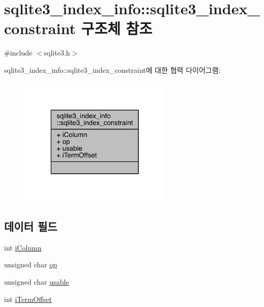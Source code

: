 \hypertarget{structsqlite3__index__info_1_1sqlite3__index__constraint}{}\section{sqlite3\+\_\+index\+\_\+info\+:\+:sqlite3\+\_\+index\+\_\+constraint 구조체 참조}
\label{structsqlite3__index__info_1_1sqlite3__index__constraint}


{\ttfamily \#include $<$sqlite3.\+h$>$}



sqlite3\+\_\+index\+\_\+info\+:\+:sqlite3\+\_\+index\+\_\+constraint에 대한 협력 다이어그램\+:
\nopagebreak
\begin{figure}[H]
\begin{center}
\leavevmode
\includegraphics[width=208pt]{dc/d83/structsqlite3__index__info_1_1sqlite3__index__constraint__coll__graph}
\end{center}
\end{figure}
\subsection*{데이터 필드}
\begin{DoxyCompactItemize}
\item 
int \hyperlink{structsqlite3__index__info_1_1sqlite3__index__constraint_a0f1e207060420058ee2881f2ea368e3a}{i\+Column}
\item 
unsigned char \hyperlink{structsqlite3__index__info_1_1sqlite3__index__constraint_a362f4ec1f71975cb0ac39a8b5e4b1476}{op}
\item 
unsigned char \hyperlink{structsqlite3__index__info_1_1sqlite3__index__constraint_ae16e62caeab743cc68bb22227dacb501}{usable}
\item 
int \hyperlink{structsqlite3__index__info_1_1sqlite3__index__constraint_a4e8368da66f34b7f07b369984b813d1b}{i\+Term\+Offset}
\end{DoxyCompactItemize}


